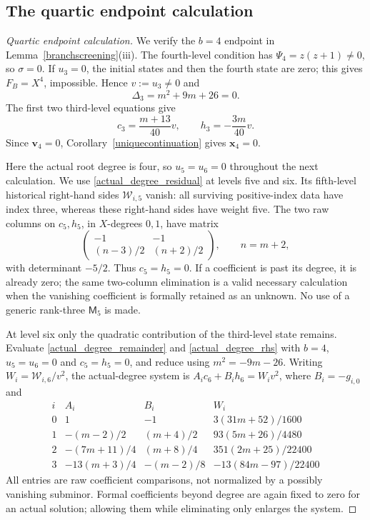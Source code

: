 \documentclass[10pt,a4paper]{amsart}
\begin{document}
\subsection{The quartic endpoint calculation}\label{app:quartic}

\begin{proof}[Quartic endpoint calculation]
We verify the $b=4$ endpoint in Lemma~\ref{branchscreening}(iii).
The fourth-level condition has $\Psi_4=z(z+1)\ne0$, so $\sigma=0$.
If $u_3=0$, the initial states and then the fourth state are zero;
this gives $F_B=X^4$, impossible.  Hence $v:=u_3\ne0$ and
\begin{equation}\label{quarticDelta3}
 \Delta_3=m^2+9m+26=0.
\end{equation}
The first two third-level equations give
\begin{equation}\label{quarticc3h3}
 c_3=\frac{m+13}{40}v,\qquad h_3=-\frac{3m}{40}v.
\end{equation}
Since $\mathbf v_4=0$, Corollary~\ref{uniquecontinuation} gives
$\mathbf x_4=0$.

Here the actual root degree is four, so $u_5=u_6=0$ throughout the
next calculation.  We use \eqref{actual_degree_residual} at levels
five and six.  Its fifth-level historical right-hand sides
$\mathcal W_{i,5}$ vanish: all surviving positive-index data have index
three, whereas these right-hand sides have weight five.  The two raw
columns on $c_5,h_5$, in $X$-degrees $0,1$, have matrix
\[
 \begin{pmatrix}-1&-1\\(n-3)/2&(n+2)/2\end{pmatrix},
 \qquad n=m+2,
\]
with determinant $-5/2$.  Thus $c_5=h_5=0$.  If a coefficient is
past its degree, it is already zero; the same two-column elimination
is a valid necessary calculation when the vanishing coefficient is formally retained as an unknown.  No use of a generic rank-three $\mathsf M_5$ is made.

At level six only the quadratic contribution of the third-level state
remains.  Evaluate \eqref{actual_degree_remainder} and
\eqref{actual_degree_rhs} with $b=4$, $u_5=u_6=0$ and $c_5=h_5=0$,
and reduce using $m^2=-9m-26$.  Writing
$W_i=\mathcal W_{i,6}/v^2$, the actual-degree system is
$A_i c_6+B_i h_6=W_i v^2$, where $B_i=-g_{i,0}$ and
\begin{equation}\label{quartic_sixth_table}
\begin{array}{c|c|c|c}
 i&A_i&B_i&W_i\\ \hline
 0&1&-1&3(31m+52)/1600\\
 1&-(m-2)/2&(m+4)/2&93(5m+26)/4480\\
 2&-(7m+11)/4&(m+8)/4&351(2m+25)/22400\\
 3&-13(m+3)/4&-(m-2)/8&-13(84m-97)/22400
\end{array}
\end{equation}
All entries are raw coefficient comparisons, not normalized by a
possibly vanishing subminor.  Formal coefficients beyond degree are
again fixed to zero for an actual solution; allowing them while
eliminating only enlarges the system.


\end{proof}
\end{document}
